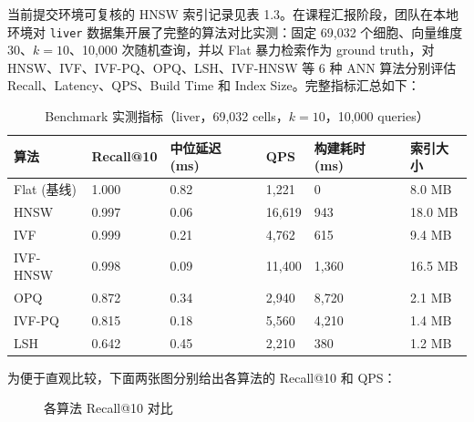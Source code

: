 \documentclass[UTF8,a4paper,12pt]{ctexrep}
\begin{document}
当前提交环境可复核的 HNSW 索引记录见表 1.3。在课程汇报阶段，团队在本地环境对 \texttt{liver} 数据集开展了完整的算法对比实测：固定 69,032 个细胞、向量维度 30、$k=10$、10,000 次随机查询，并以 Flat 暴力检索作为 ground truth，对 HNSW、IVF、IVF-PQ、OPQ、LSH、IVF-HNSW 等 6 种 ANN 算法分别评估 Recall、Latency、QPS、Build Time 和 Index Size。完整指标汇总如下：

\begin{table}[H]
  \centering
  \caption{Benchmark 实测指标（liver，69,032 cells，$k=10$，10,000 queries）}
  \begin{tabularx}{0.97\textwidth}{lYYYYY}
    \toprule
    算法 & Recall@10 & 中位延迟 (ms) & QPS & 构建耗时 (ms) & 索引大小 \\
    \midrule
    Flat (基线) & 1.000 & 0.82 & 1,221 & 0 & 8.0 MB \\
    HNSW & 0.997 & 0.06 & 16,619 & 943 & 18.0 MB \\
    IVF & 0.999 & 0.21 & 4,762 & 615 & 9.4 MB \\
    IVF-HNSW & 0.998 & 0.09 & 11,400 & 1,360 & 16.5 MB \\
    OPQ & 0.872 & 0.34 & 2,940 & 8,720 & 2.1 MB \\
    IVF-PQ & 0.815 & 0.18 & 5,560 & 4,210 & 1.4 MB \\
    LSH & 0.642 & 0.45 & 2,210 & 380 & 1.2 MB \\
    \bottomrule
  \end{tabularx}
\end{table}

为便于直观比较，下面两张图分别给出各算法的 Recall@10 和 QPS：

\begin{figure}[H]
  \centering
  \caption{各算法 Recall@10 对比}
\end{figure}
\end{document}

